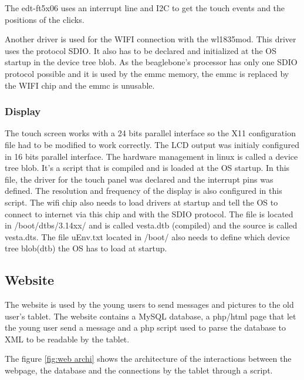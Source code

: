The edt-ft5x06 uses an interrupt line and I2C to get the touch events and the positions of the clicks.

Another driver is used for the WIFI connection with the wl1835mod. This driver uses the protocol SDIO. It also has to be declared and initialized at the OS startup in the device tree blob. As the beaglebone's processor has only one SDIO protocol possible and it is used by the emmc memory, the emmc is replaced by the WIFI chip and the emmc is unusable.

\subsubsection{Display}
The touch screen works with a 24 bits parallel interface so the X11 configuration file had to be modified to work correctly. The LCD output was initialy configured in 16 bits parallel interface.
The hardware management in linux is called a device tree blob. It’s a script that is compiled and is loaded at the OS startup. In this file, the driver for the touch panel was declared and the interrupt pins was defined. The resolution and frequency of the display is also configured in this script. The wifi chip also needs to load drivers at startup and tell the OS to connect to internet via this chip and with the SDIO protocol.
The file is located in /boot/dtbs/3.14xx/ and is called vesta.dtb (compiled) and the source is called vesta.dts. The file uEnv.txt located in /boot/ also needs to define which device tree blob(dtb) the OS has to load at startup.

\clearpage

\subsection{Website}

The website is used by the young users to send messages and pictures to the old user’s tablet.
The website contains a MySQL database, a php/html page that let the young user send a message and a php script used to parse the database to XML to be readable by the tablet.

The figure \ref{fig:web archi} shows the architecture of the interactions between the webpage, the database and the connections by the tablet through a script.

